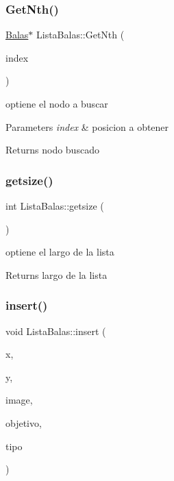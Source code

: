 \subsubsection{\texorpdfstring{Get\+Nth()}{GetNth()}}
{\footnotesize\ttfamily \hyperlink{classBalas}{Balas}$\ast$ Lista\+Balas\+::\+Get\+Nth (\begin{DoxyParamCaption}\item[{int}]{index }\end{DoxyParamCaption})\hspace{0.3cm}{\ttfamily [inline]}}



optiene el nodo a buscar 


\begin{DoxyParams}{Parameters}
{\em index} & posicion a obtener \\
\hline
\end{DoxyParams}
\begin{DoxyReturn}{Returns}
nodo buscado 
\end{DoxyReturn}
\mbox{\label{classListaBalas_acd8346cc5d06186c486c28743a4e9ccb}} 
\subsubsection{\texorpdfstring{getsize()}{getsize()}}
{\footnotesize\ttfamily int Lista\+Balas\+::getsize (\begin{DoxyParamCaption}{ }\end{DoxyParamCaption})\hspace{0.3cm}{\ttfamily [inline]}}



optiene el largo de la lista 

\begin{DoxyReturn}{Returns}
largo de la lista 
\end{DoxyReturn}
\mbox{\label{classListaBalas_a5ba03ff5277361dcf0f17d44e644fb9d}} 
\subsubsection{\texorpdfstring{insert()}{insert()}}
{\footnotesize\ttfamily void Lista\+Balas\+::insert (\begin{DoxyParamCaption}\item[{int}]{x,  }\item[{int}]{y,  }\item[{Gtk\+Widget $\ast$}]{image,  }\item[{\hyperlink{classEstudiantes}{Estudiantes} $\ast$}]{objetivo,  }\item[{\hyperlink{classCursos}{Cursos} $\ast$}]{tipo }\end{DoxyParamCaption})\hspace{0.3cm}{\ttfamily [inline]}}



